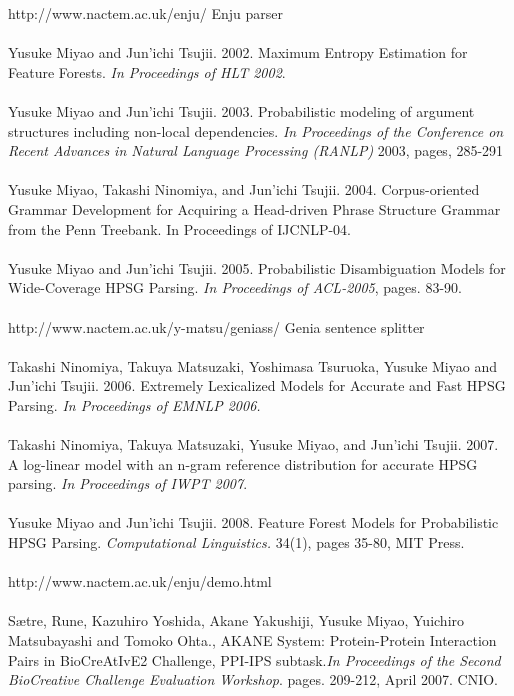 \big[50\big] http://www.nactem.ac.uk/enju/ Enju parser \\  \\
\big[51\big] Yusuke Miyao and Jun'ichi Tsujii. 2002. Maximum Entropy Estimation for Feature Forests. \emph{In Proceedings of HLT 2002}.\\  \\
\big[52\big] Yusuke Miyao and Jun'ichi Tsujii. 2003. Probabilistic modeling of argument structures including non-local dependencies. \emph{In Proceedings of the Conference on Recent Advances in Natural Language Processing (RANLP)} 2003, pages, 285-291 \\  \\
\big[53\big] Yusuke Miyao, Takashi Ninomiya, and Jun'ichi Tsujii. 2004. Corpus-oriented Grammar Development for Acquiring a Head-driven Phrase Structure Grammar from the Penn Treebank. In Proceedings of IJCNLP-04.\\  \\
\big[54\big] Yusuke Miyao and Jun'ichi Tsujii. 2005. Probabilistic Disambiguation Models for Wide-Coverage HPSG Parsing. \emph{In Proceedings of ACL-2005}, pages. 83-90.\\  \\
\big[55\big] http://www.nactem.ac.uk/y-matsu/geniass/ Genia sentence splitter\\  \\
\big[56\big] Takashi Ninomiya, Takuya Matsuzaki, Yoshimasa Tsuruoka, Yusuke Miyao and Jun'ichi Tsujii. 2006. Extremely Lexicalized Models for Accurate and Fast HPSG Parsing. \emph{In Proceedings of EMNLP 2006.}\\  \\
\big[57\big] Takashi Ninomiya, Takuya Matsuzaki, Yusuke Miyao, and Jun'ichi Tsujii. 2007. A log-linear model with an n-gram reference distribution for accurate HPSG parsing. \emph{In Proceedings of IWPT 2007}.\\  \\
\big[58\big] Yusuke Miyao and Jun'ichi Tsujii. 2008. Feature Forest Models for Probabilistic HPSG Parsing. \emph{Computational Linguistics.} 34(1), pages 35-80, MIT Press.\\  \\
\big[59\big] http://www.nactem.ac.uk/enju/demo.html\\  \\
\big[60\big] Sætre, Rune, Kazuhiro Yoshida, Akane Yakushiji, Yusuke Miyao, Yuichiro Matsubayashi and Tomoko Ohta., AKANE System: Protein-Protein Interaction Pairs in BioCreAtIvE2 Challenge, PPI-IPS subtask.\emph{In Proceedings of the Second BioCreative Challenge Evaluation Workshop}. pages. 209-212, April 2007. CNIO. \\  \\
